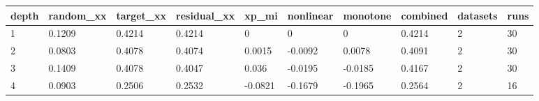 \begin{tabular}{llllllllll}
\toprule
depth & random\_xx & target\_xx & residual\_xx & xp\_mi & nonlinear & monotone & combined & datasets & runs \\
\midrule
1 & 0.1209 & 0.4214 & 0.4214 & 0 & 0 & 0 & 0.4214 & 2 & 30 \\
2 & 0.0803 & 0.4078 & 0.4074 & 0.0015 & -0.0092 & 0.0078 & 0.4091 & 2 & 30 \\
3 & 0.1409 & 0.4078 & 0.4047 & 0.036 & -0.0195 & -0.0185 & 0.4167 & 2 & 30 \\
4 & 0.0903 & 0.2506 & 0.2532 & -0.0821 & -0.1679 & -0.1965 & 0.2564 & 2 & 16 \\
\bottomrule
\end{tabular}
